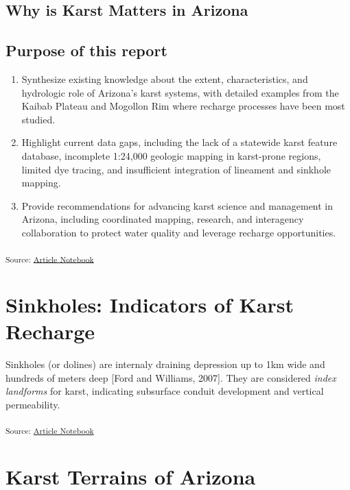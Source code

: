\documentclass[
]{agujournal2019}
\begin{document}
\subsection{Why is Karst Matters in
Arizona}\label{why-is-karst-matters-in-arizona}

\subsection{Purpose of this report}\label{purpose-of-this-report}

\begin{enumerate}
\def\labelenumi{\arabic{enumi}.}
\item
  Synthesize existing knowledge about the extent, characteristics, and
  hydrologic role of Arizona's karst systems, with detailed examples
  from the Kaibab Plateau and Mogollon Rim where recharge processes have
  been most studied.
\item
  Highlight current data gaps, including the lack of a statewide karst
  feature database, incomplete 1:24,000 geologic mapping in karst-prone
  regions, limited dye tracing, and insufficient integration of
  lineament and sinkhole mapping.
\item
  Provide recommendations for advancing karst science and management in
  Arizona, including coordinated mapping, research, and interagency
  collaboration to protect water quality and leverage recharge
  opportunities.
\end{enumerate}

\textsubscript{Source:
\href{https://Ryan3Lima.github.io/ATUR-KARST/index.ipynb.html}{Article
Notebook}}

\section{Sinkholes: Indicators of Karst
Recharge}\label{sinkholes-indicators-of-karst-recharge}

Sinkholes (or dolines) are internaly draining depression up to 1km wide
and hundreds of meters deep {[}Ford and Williams, 2007{]}. They are
considered \emph{index landforms} for karst, indicating subsurface
conduit development and vertical permeability.

\textsubscript{Source:
\href{https://Ryan3Lima.github.io/ATUR-KARST/index.ipynb.html}{Article
Notebook}}

\section{Karst Terrains of Arizona}\label{karst-terrains-of-arizona}
\end{document}
